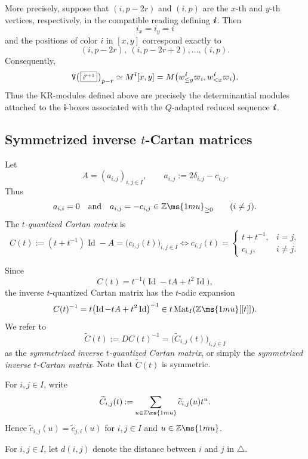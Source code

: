\documentclass[12pt, leqno]{amsart}
\numberwithin{equation}{section}
\theoremstyle{plain}
\theoremstyle{definition}
\newcommand{\Vkm}[1]{%
  \ttV\bigl(\hspace{0.2ex}\scalebox{.8}{\(\boxed{#1}\)}\hspace{0.2ex}\bigr)%
}
\newcommand{\seteq}{\mathbin{:=}}
\newcommand{\Z}{\mathbb{Z}\ms{1mu}}
\newcommand{\Dynkin}{\triangle}
\newcommand{\ii}{ \textbf{\textit{i}}}
\newcommand{\tC}{\widetilde{C}}
\newcommand{\tc}{\widetilde{c}}
\newcommand{\bfi}{\mathbf{i}}
\newcommand{\ttV}{\mathtt{V}}
\newcommand{\qtq}[1][{and}]{\quad\text{{#1}}\quad}
\begin{document}
More precisely, suppose that \((i,p-2r)\) and \((i,p)\) are the
\(x\)-th and \(y\)-th vertices, respectively, in the compatible
reading defining \(\ii\).  Then
\[
i_x=i_y=i
\]
and the positions of color \(i\) in \([x,y]\) correspond exactly to
\[
(i,p-2r),\ (i,p-2r+2),\ldots,(i,p).
\]
Consequently,
\[
\begin{aligned}
\Vkm{i^{r+1}}_{p-r}
\simeq M^\ii[x,y]=
M\bigl(w_{\leq y}^\ii\varpi_i,w_{<x}^\ii\varpi_i \bigr).
\end{aligned}
\]
Thus the KR-modules defined above are precisely the determinantial
modules attached to the \(\bfi\)-boxes associated with the
\(Q\)-adapted reduced sequence \(\ii\).

\subsection{Symmetrized inverse \texorpdfstring{\(t\)}{t}-Cartan matrices}
\label{subsec: inverse t-Cartan}

Let
\[
A=(a_{i,j})_{i,j\in I},
\qquad
a_{i,j}\seteq2\delta_{i,j}-c_{i,j}.
\]
Thus
\[
a_{i,i}=0 \qtq a_{i,j}=-c_{i,j}\in\Z_{\geq0}
\qquad(i\ne j).
\]
The \emph{\(t\)-quantized Cartan matrix} is
\[
C(t)
\seteq
(t+t^{-1})\operatorname{Id}-A
=
\bigl(c_{i,j}(t)\bigr)_{i,j\in I} 
\Longleftrightarrow
c_{i,j}(t)
=
\begin{cases}
t+t^{-1},&i=j,\\
c_{i,j},&i\ne j.
\end{cases}
\]

Since
\[
C(t) = t^{-1}
\bigl(\operatorname{Id}-tA+t^2\operatorname{Id}\bigr),
\]
the inverse \(t\)-quantized Cartan matrix has the \(t\)-adic expansion
\[
C(t)^{-1}=
t \bigl(\operatorname{Id}-tA+t^2\operatorname{Id}\bigr)^{-1}
\in t\operatorname{Mat}_I(\Z[[t]]).
\]
We refer to
\[
\tC(t) \seteq D C(t)^{-1} = \bigl(\tC_{i,j}(t)\bigr)_{i,j\in I}
\]
as the \emph{symmetrized inverse \(t\)-quantized Cartan matrix}, or
simply the \emph{symmetrized inverse \(t\)-Cartan matrix}.
Note that \(\tC(t)\) is symmetric.

For \(i,j\in I\), write
\begin{align} \label{eq: coeff}
\tC_{i,j}(t) \seteq \sum_{u\in\Z}\tc_{i,j}(u)t^u.
\end{align}
Hence
$\tc_{i,j}(u) = \tc_{j,i}(u)$ for $i,j\in I$ and $u\in\Z$.

For \(i,j\in I\), let \(d(i,j)\) denote the distance between \(i\)
and \(j\) in $\Dynkin$.
\end{document}
